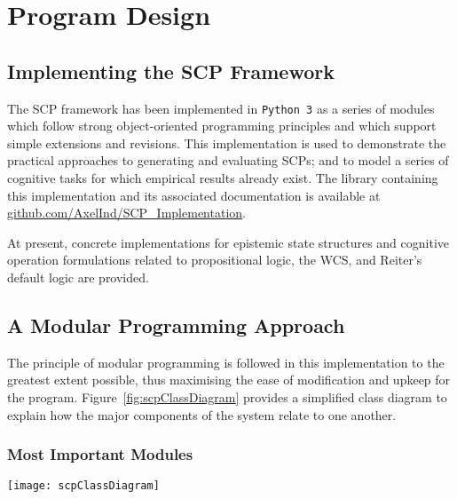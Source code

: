 \chapter{Program Design} \label{chp:program}
\section{Implementing the SCP Framework}

The SCP framework has been implemented in \texttt{Python 3} as a series of modules which follow strong object-oriented programming principles and which support simple extensions and revisions. This implementation is used to demonstrate the practical approaches to generating and evaluating SCPs; and to model a series of cognitive tasks for which empirical results already exist. The library containing this implementation and its associated documentation is available at \href{https://github.com/AxelInd/SCP_Implementation}{github.com/AxelInd/SCP\_Implementation}.

At present, concrete implementations for epistemic state structures and cognitive operation formulations related to propositional logic, the WCS, and Reiter's default logic are provided.

\section{A Modular Programming Approach}
The principle of modular programming is followed in this implementation to the greatest extent possible, thus maximising the ease of modification and upkeep for the program. Figure~\ref{fig:scpClassDiagram} provides a simplified class diagram to explain how the major components of the system relate to one another.

\subsection{Most Important Modules}


\begin{sidewaysfigure}
\centering \texttt{[image: scpClassDiagram]}
\caption{Class diagram for the implementation of the SCP Framework.}
\label{fig:scpClassDiagram}
\end{sidewaysfigure}


